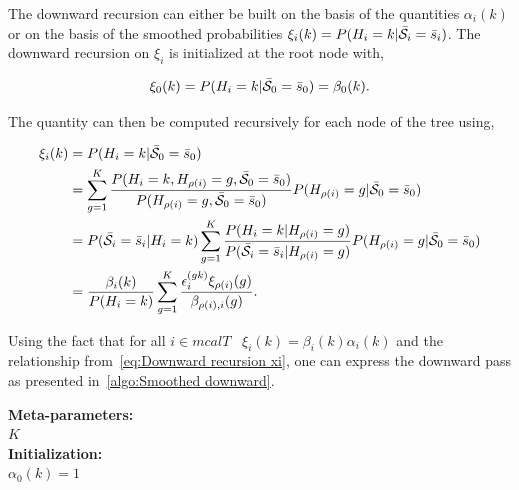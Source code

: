 \documentclass[a4paper,11pt]{report}
\begin{document}
{				The downward recursion can either be built on the basis of the quantities $\alpha_{i}(k)$ or on the basis of the smoothed probabilities $\xi_{i}(k) = P(H_{i}=k | \bar{\mathcal{S}}_{i}= \bar{s}_{i})$. The downward recursion on $\xi_{i}$ is initialized at the root node with,
				
				\begin{equation}
				  \xi_{0}(k)= P(H_{i}=k | \bar{\mathcal{S}}_{0}=\bar{s}_{0}) = \beta_{0}(k).
				  \label{eq:Downward init}
				\end{equation}

				The quantity can then be computed recursively for each node of the tree using,
				
				\begin{equation}
					\begin{split}
						\xi_{i}(k)	&= P(H_{i}=k | \bar{\mathcal{S}}_{0}=\bar{s}_{0}) \\
												&= \sum_{g=1}^{K} \frac{P(H_{i}=k, H_{\rho(i)}=g, \bar{\mathcal{S}}_{0}= \bar{s}_{0})}{P(H_{\rho(i)}=g, \bar{\mathcal{S}}_{0}= \bar{s}_{0})} P(H_{\rho(i)}=g | \bar{\mathcal{S}}_{0}= \bar{s}_{0})\\
												&= P(\bar{\mathcal{S}}_{i}= \bar{s}_{i} | H_{i}=k)  
													 \sum_{g=1}^{K} \frac{P(H_{i}=k | H_{\rho(i)}=g)}{P(\bar{\mathcal{S}}_{i}= \bar{s}_{i} | H_{\rho(i)}=g)}
 													 P(H_{\rho(i)}=g | \bar{\mathcal{S}}_{0}= \bar{s}_{0})\\
 												&= \frac{\beta_{i}(k)}{P(H_{i}=k)} \sum_{g=1}^{K} \frac{ \epsilon_{i}^{(gk)} \xi_{\rho(i)}(g)}{\beta_{\rho(i),i}(g)}.
						\end{split}
						\label{eq:Downward recursion xi}
				\end{equation}
				
				Using the fact that for all $i \in mcalT \;\;\; \xi_{i}(k) = \beta_{i}(k)\alpha_{i}(k)$ and the relationship from~\ref{eq:Downward recursion xi}, one can express the downward pass as presented in~\ref{algo:Smoothed downward}.
    
				\begin{center}
					\begin{algorithm}
						\textbf{Meta-parameters:}\\
							$K$\\
								
						\textbf{Initialization:}\\
							$\alpha_{0}(k) = 1$
								

\end{algorithm}
\end{center}}
\end{document}
